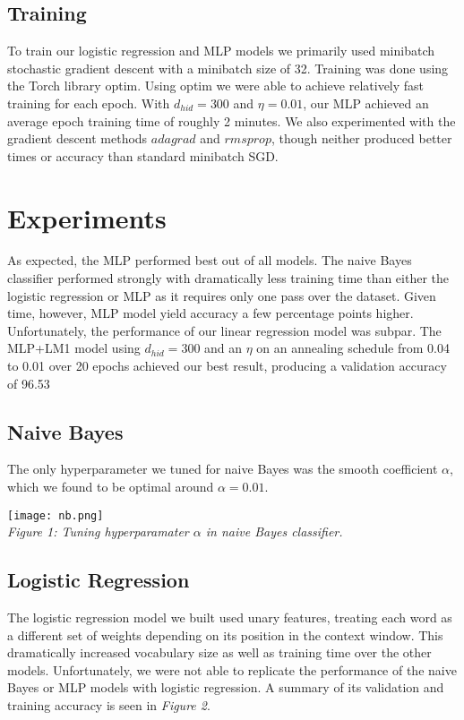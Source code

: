 \documentclass[11pt]{article}
\begin{document}
{{\subsection{Training}
To train our logistic regression and MLP models we primarily used minibatch stochastic gradient descent with a minibatch size of 32. Training was done using the Torch library optim. Using optim we were able to achieve relatively fast training for each epoch. With $d_{hid} = 300$ and $\eta = 0.01$, our MLP achieved an average epoch training time of roughly 2 minutes. We also experimented with the gradient descent methods $adagrad$ and $rmsprop$, though neither produced better times or accuracy than standard minibatch SGD.

\section{Experiments}

As expected, the MLP performed best out of all models. The naive Bayes classifier performed strongly with dramatically less training time than either the logistic regression or MLP as it requires only one pass over the dataset. Given time, however, MLP model yield accuracy a few percentage points higher. Unfortunately, the performance of our linear regression model was subpar. The MLP+LM1 model using $d_{hid} = 300$ and an $\eta$ on an annealing schedule from 0.04 to 0.01 over 20 epochs achieved our best result, producing a validation accuracy of 96.53%

\subsection{Naive Bayes}
The only hyperparameter we tuned for naive Bayes was the smooth coefficient $\alpha$, which we found to be optimal around $\alpha = 0.01$.

\begin{center}
    \texttt{[image: nb.png]}\\
    \textit{Figure 1: Tuning hyperparamater $\alpha$ in naive Bayes classifier.}
\end{center}

\subsection{Logistic Regression}
The logistic regression model we built used unary features, treating each word as a different set of weights depending on its position in the context window. This dramatically increased vocabulary size as well as training time over the other models. Unfortunately, we were not able to replicate the performance of the naive Bayes or MLP models with logistic regression. A summary of its validation and training accuracy is seen in \textit{Figure 2}.

}}
\end{document}
